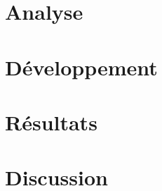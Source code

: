 \documentclass[a4paper,12pt,notitlepage]{report}
\begin{document}

\vspace*{\fill}

\vspace*{\fill}
\tableofcontents



\chapter{Analyse}



\chapter{Développement}







\chapter{Résultats}



\chapter{Discussion}




\nocite{*} %
\printbibliography
\end{document}
